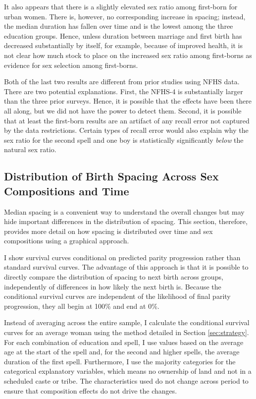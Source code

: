 \documentclass[12pt,letterpaper]{article}
\begin{document}
It also appears that there is a slightly elevated sex ratio among 
first-born for urban women. 
There is, however, no corresponding increase in spacing; instead,
the median duration has fallen over time and is the lowest among
the three education groups.
Hence, unless duration between marriage and first birth has decreased 
substantially by itself, for example, because of improved health, it
is not clear how much stock to place on the increased sex ratio
among first-borns as evidence for sex selection among first-borns.

Both of the last two results are different from prior studies using NFHS data.
There are two potential explanations.
First, the NFHS-4 is substantially larger than the three prior surveys.
Hence, it is possible that the effects have been there all along, but 
we did not have the power to detect them.
Second, it is possible that at least the first-born results are an
artifact of any recall error not captured by the data restrictions.
Certain types of recall error would also explain why the sex ratio for
the second spell and one boy is statistically significantly \emph{below} 
the natural sex ratio.


\subsection{Distribution of Birth Spacing Across Sex Compositions and Time}

Median spacing is a convenient way to understand the overall changes but
may hide important differences in the distribution of spacing.
This section, therefore, provides more detail on how spacing is distributed
over time and sex compositions using a graphical approach.

I show survival curves conditional on predicted parity progression rather than
standard survival curves. 
The advantage of this approach is that it is possible to directly compare 
the distribution of spacing to next birth across groups, independently of 
differences in how likely the next birth is.
Because the conditional survival curves are independent of the likelihood
of final parity progression, they all begin at 100\% and end at 0\%.

Instead of averaging across the entire sample, I calculate the conditional
survival curves for an average woman using the method detailed in 
Section \ref{sec:strategy}.
For each combination of education and spell, I use values based on the
average age at the start of the spell and, for the second and higher
spells, the average duration of the first spell.
Furthermore, I use the majority categories for the categorical explanatory 
variables, which means no ownership of land and not in a scheduled caste or 
tribe.
The characteristics used do not change across period to ensure that 
composition effects do not drive the changes.
\end{document}

